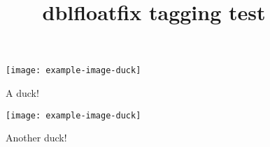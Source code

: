 \documentclass[twocolumn]{article}
\title{dblfloatfix tagging test}
\begin{document}
\kant[1-2]
\begin{figure*}
\centering
\texttt{[image: example-image-duck]}
\caption{A duck!}
\end{figure*}
\kant[3-4]
\begin{figure*}[b]
\centering
\texttt{[image: example-image-duck]}
\caption{Another duck!}
\end{figure*}
\kant[5-6]
\end{document}
